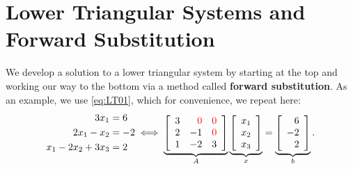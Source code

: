 \section{Lower Triangular Systems and Forward Substitution}
\label{sec:ForwardSubstitution}

We develop a solution to a lower triangular system by starting at the top and working our way to the bottom via a method called \textbf{forward substitution}. As an example, we use \eqref{eq:LT01}, which for convenience, we repeat here:
\begin{equation} 
\label{eq:LT01b}
\begin{aligned}
     3 x_1 &=6 \\
     2 x_1 - x_2 &= -2\\
    x_1 - 2 x_2 + 3 x_3  &= 2
    \end{aligned} \iff \underbrace{\left[\begin{array}{rrr} 3 & \color{red} 0 & \color{red} 0\\
2 & -1 & \color{red} 0 \\ 1 & -2 & 3  \end{array}\right]}_{A}  \underbrace{\left[\begin{array}{c} x_1 \\x_2 \\x_3\end{array} \right]}_{x}
= \underbrace{\left[\begin{array}{r} 6 \\-2 \\2\end{array} \right]}_{b}.
\end{equation}

